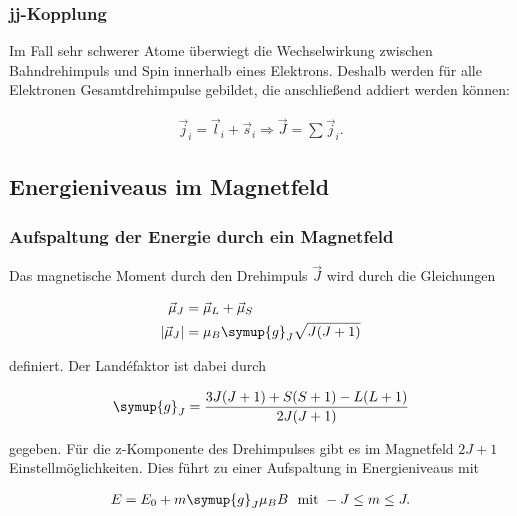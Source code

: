             \subsubsection{jj-Kopplung}

                Im Fall sehr schwerer Atome überwiegt die Wechselwirkung zwischen Bahndrehimpuls 
                und Spin innerhalb eines Elektrons. Deshalb werden für alle Elektronen 
                Gesamtdrehimpulse gebildet, die anschließend addiert werden können:

                \begin{align*}
                    \vec{j}_i = \vec{l}_i+\vec{s}_i \Rightarrow \vec{J} = \sum \vec{j}_i.
                \end{align*}

        \subsection{Energieniveaus im Magnetfeld}

            \subsubsection{Aufspaltung der Energie durch ein Magnetfeld}

                Das magnetische Moment durch den Drehimpuls $\vec{J}$ 
                wird durch die Gleichungen 

                \begin{align*}
                    \vec{\mu}_J &= \vec{\mu}_L+\vec{\mu}_S\\
                    \lvert \vec{\mu}_J\rvert &= \mu_B\symup{g}_J\sqrt{J(J+1)}
                \end{align*}

                definiert.
                Der Land\'{e}faktor ist dabei durch 

                \begin{align*}
                    \symup{g}_J = \frac{3J(J+1)+S(S+1)-L(L+1)}{2J(J+1)}
                \end{align*}

                gegeben.
                Für die z-Komponente des Drehimpulses gibt es im Magnetfeld $2J+1$ 
                Einstellmöglichkeiten. Dies führt zu einer Aufspaltung in Energieniveaus 
                mit 

                \begin{align*}
                    E = E_0 + m\symup{g}_J\mu_B B\,\,\,\,\text{mit}\,\,-J\leq m\leq J.
                \end{align*}


